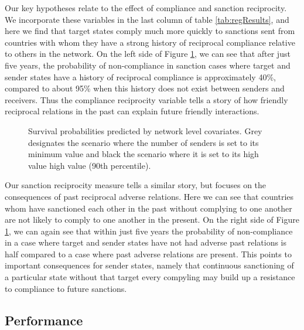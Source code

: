 Our key hypotheses relate to the effect of compliance and sanction reciprocity. We incorporate these variables in the last column of table \ref{tab:regResults}, and here we find that target states comply much more quickly to sanctions sent from countries with whom they have a strong history of reciprocal compliance relative to others in the network. On the left side of Figure \ref{fig:surv3}, we can see that after just five years, the probability of non-compliance in sanction cases where target and sender states have a history of reciprocal compliance is approximately 40\%, compared to about 95\% when this history does not exist between senders and receivers. Thus the compliance reciprocity variable tells a story of how friendly reciprocal relations in the past can explain future friendly interactions. 

\newpage
\begin{figure}[ht]
	\centering
	\caption{Survival probabilities predicted by network level covariates. Grey designates the scenario where the number of senders is set to its minimum value and black the scenario where it is set to its high value high value (90th percentile).}
	\resizebox{1\textwidth}{!}{}	
	\label{fig:surv3}	
\end{figure}
\newpage

Our sanction reciprocity measure tells a similar story, but focuses on the consequences of past reciprocal adverse relations. Here we can see that countries whom have sanctioned each other in the past without complying to one another are not likely to comply to one another in the present. On the right side of Figure \ref{fig:surv3}, we can again see that within just five years the probability of non-compliance in a case where target and sender states have not had adverse past relations is half compared to a case where past adverse relations are present. This points to important consequences for sender states, namely that continuous sanctioning of a particular state without that target every compyling  may build up a resistance to compliance to future sanctions. 

\subsection*{Performance}

